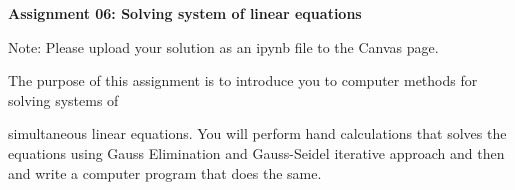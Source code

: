 \documentclass[a4paper,12pt]{article}
\begin{document}
\begin{centering}
	\textbf{
		Assignment 06: Solving system of linear equations\\
	}
\end{centering}


Note: Please upload your solution as an ipynb file to the Canvas page.

\vspace{1em}
 
 The purpose of this assignment is to introduce you to computer methods for solving systems of

 simultaneous linear equations. You will perform hand calculations that solves the equations using
Gauss Elimination and Gauss-Seidel iterative approach and then and write a computer program that does the same.
 
\end{document}
